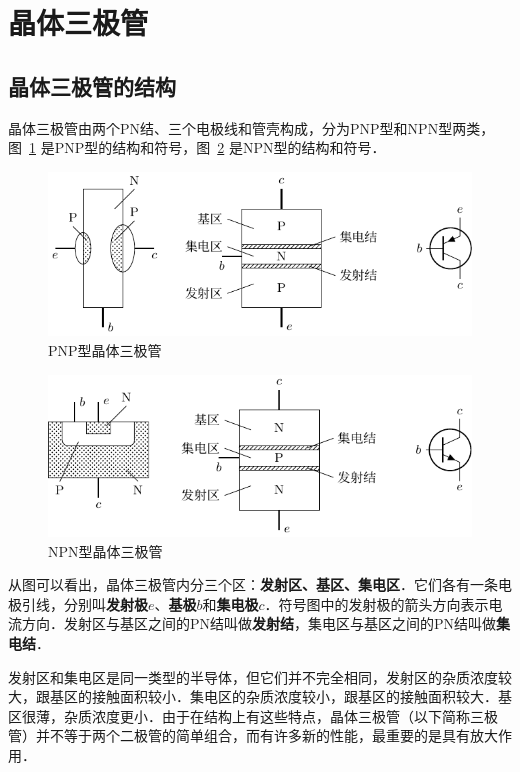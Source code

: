 \section{晶体三极管}

\subsection{晶体三极管的结构}

晶体三极管由两个PN结、三个电极线和管壳构成，分为PNP型和NPN型两类，图~\ref{fig_B_8-28} 是PNP型的结构和符号，图~\ref{fig_B_8-29} 是NPN型的结构和符号．
\begin{figure}[htbp]
    \centering
    \includegraphics{fig/B/8-28.pdf}
    \caption{PNP型晶体三极管}\label{fig_B_8-28}
\end{figure}

\begin{figure}[htbp]
    \centering
    \includegraphics{fig/B/8-29.pdf}
    \caption{NPN型晶体三极管}\label{fig_B_8-29}
\end{figure}

从图可以看出，晶体三极管内分三个区：\textbf{发射区、基区、集电区}．它们各有一条电极引线，分别叫\textbf{发射极$e$}、\textbf{基极$b$}和\textbf{集电极$c$}．符号图中的发射极的箭头方向表示电流方向．发射区与基区之间的PN结叫做\textbf{发射结}，集电区与基区之间的PN结叫做\textbf{集电结}．

发射区和集电区是同一类型的半导体，但它们并不完全相同，发射区的杂质浓度较大，跟基区的接触面积较小．集电区的杂质浓度较小，跟基区的接触面积较大．基区很薄，杂质浓度更小．由于在结构上有这些特点，晶体三极管（以下简称三极管）并不等于两个二极管的简单组合，而有许多新的性能，最重要的是具有放大作用．

